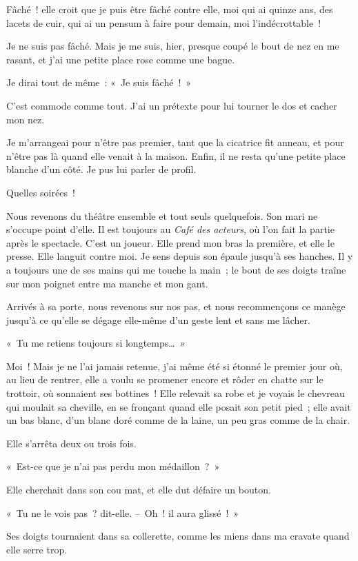 \documentclass[french,twoside]{book} %
\begin{document}
Fâché ! elle croit que je puis être fâché contre elle, moi qui ai quinze ans, des lacets de cuir, qui ai un pensum à faire pour demain, moi l’indécrottable !\par
Je ne suis pas fâché. Mais je me suis, hier, presque coupé le bout de nez en me rasant, et j’ai une petite place rose comme une bague.\par
Je dirai tout de même : « Je suis fâché ! »\par
C’est commode comme tout. J’ai un prétexte pour lui tourner le dos et cacher mon nez.\par
\bigbreak
\noindent Je m’arrangeai pour n’être pas premier, tant que la cicatrice fit anneau, et pour n’être pas là quand elle venait à la maison. Enfin, il ne resta qu’une petite place blanche d’un côté. Je pus lui parler de profil.\par
Quelles soirées !\par
Nous revenons du théâtre ensemble et tout seuls quelquefois. Son mari ne s’occupe point d’elle. Il est toujours au \emph{Café des acteurs}, où l’on fait la partie après le spectacle. C’est un joueur. Elle prend mon bras la première, et elle le presse. Elle languit contre moi. Je sens depuis son épaule jusqu’à ses hanches. Il y a toujours une de ses mains qui me touche la main ; le bout de ses doigts traîne sur mon poignet entre ma manche et mon gant.\par
Arrivés à sa porte, nous revenons sur nos pas, et nous recommençons ce manège jusqu’à ce qu’elle se dégage elle-même d’un geste lent et sans me lâcher.\par
« Tu me retiens toujours si longtemps… »\par
Moi ! Mais je ne l’ai jamais retenue, j’ai même été si étonné le premier jour où, au lieu de rentrer, elle a voulu se promener encore et rôder en chatte sur le trottoir, où sonnaient ses bottines ! Elle relevait sa robe et je voyais le chevreau qui moulait sa cheville, en se fronçant quand elle posait son petit pied ; elle avait un bas blanc, d’un blanc doré comme de la laine, un peu gras comme de la chair.\par
Elle s’arrêta deux ou trois fois.\par
« Est-ce que je n’ai pas perdu mon médaillon ? »\par
Elle cherchait dans son cou mat, et elle dut défaire un bouton.\par
« Tu ne le vois pas ? dit-elle. – Oh ! il aura glissé ! »\par
Ses doigts tournaient dans sa collerette, comme les miens dans ma cravate quand elle serre trop.\par
\end{document}
